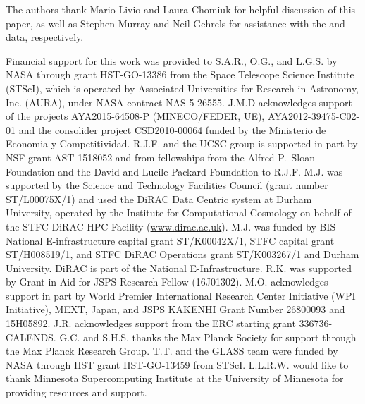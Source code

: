 
\begin{acknowledgments}
The authors thank Mario Livio and Laura Chomiuk for helpful discussion
of this paper, as well as Stephen Murray and Neil Gehrels for
assistance with the \Chandra and \SWIFT data, respectively.

Financial support for this work was provided to S.A.R., O.G., and L.G.S. by NASA
through grant HST-GO-13386 from the Space Telescope Science Institute
(STScI), which is operated by Associated Universities for Research in
Astronomy, Inc. (AURA), under NASA contract NAS 5-26555.
J.M.D acknowledges support of the
projects AYA2015-64508-P (MINECO/FEDER, UE), AYA2012-39475-C02-01 and
the consolider project CSD2010-00064 funded by the Ministerio de
Economia y Competitividad.
R.J.F. and the UCSC group is supported in part by NSF grant
AST-1518052 and from fellowships from the Alfred P.\ Sloan Foundation
and the David and Lucile Packard Foundation to R.J.F.
M.J. was supported by the Science and
Technology Facilities Council (grant number ST/L00075X/1) and used the
DiRAC Data Centric system at Durham University, operated by the
Institute for Computational Cosmology on behalf of the STFC DiRAC HPC
Facility (\url{www.dirac.ac.uk}).  M.J. was funded by BIS National
E-infrastructure capital grant ST/K00042X/1, STFC capital grant
ST/H008519/1, and STFC DiRAC Operations grant ST/K003267/1 and Durham
University. DiRAC is part of the National E-Infrastructure.
R.K. was supported by Grant-in-Aid for JSPS Research Fellow (16J01302).
M.O.  acknowledges support in part by World Premier International
Research Center Initiative (WPI Initiative), MEXT, Japan, and JSPS
KAKENHI Grant Number 26800093 and 15H05892.
J.R. acknowledges support from the ERC starting grant
336736-CALENDS.
G.C. and S.H.S. thanks the Max Planck Society for support through the Max Planck
Research Group.
T.T. and the GLASS team were funded by NASA through HST grant
HST-GO-13459 from STScI.
L.L.R.W. would like to thank Minnesota Supercomputing Institute at
the University of Minnesota for providing resources and support.


\end{acknowledgments}
